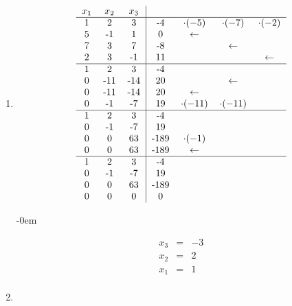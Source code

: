 \begin{enumerate}
				\item
											
					\[
						\begin{tabular} {ccc|cccc}
							$x_1$ & $x_2$ & $x_3$ & & &\\
							\hline
							1 & 2 & 3 & -4 & $\cdot(-5)$ & $\cdot(-7)$ & $\cdot(-2)$ \\
							5 & -1 & 1 & 0 & $\leftarrow$ & & \\
							7 & 3 & 7 & -8 & & $\leftarrow$ & \\
							2 & 3 & -1 & 11 & & & $\leftarrow$ \\
							\hline
							1 & 2 & 3 & -4 & & & \\
							0 & -11 & -14 & 20 & & $\leftarrow$ & \\
							0 & -11 & -14 & 20 & $\leftarrow$ & & \\
							0 & -1 & -7 & 19 & $\cdot(-11)$ & $\cdot(-11)$ & \\
							\hline
							1 & 2 & 3 & -4 & & & \\
							0 & -1 & -7 & 19 & & & \\
							0 & 0 & 63 & -189 & $\cdot(-1)$ & & \\
							0 & 0 & 63 & -189 & $\leftarrow$ & & \\
							\hline
							1 & 2 & 3 & -4 & & & \\
							0 & -1 & -7 & 19 & & & \\
							0 & 0 & 63 & -189 & & & \\
							0 & 0 & 0 & 0 & & & \\
						\end{tabular}
					\]
					
					\abovedisplayskip-0em
					
					\[
						\begin{array} {ccc}
							x_3 & = & -3\\
							x_2 & = & 2\\
							x_1 & = & 1\\
						\end{array}
					\]
							
				\item
						

\end{enumerate}

